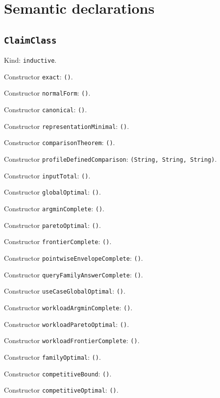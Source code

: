 \documentclass[11pt]{article}
\begin{document}
\section*{Semantic declarations}
\subsection*{\texttt{ClaimClass}}
\noindent Kind: \texttt{inductive}.\par
\noindent Constructor \texttt{exact}: \texttt{()}.\par
\noindent Constructor \texttt{normalForm}: \texttt{()}.\par
\noindent Constructor \texttt{canonical}: \texttt{()}.\par
\noindent Constructor \texttt{representationMinimal}: \texttt{()}.\par
\noindent Constructor \texttt{comparisonTheorem}: \texttt{()}.\par
\noindent Constructor \texttt{profileDefinedComparison}: \texttt{(String, String, String)}.\par
\noindent Constructor \texttt{inputTotal}: \texttt{()}.\par
\noindent Constructor \texttt{globalOptimal}: \texttt{()}.\par
\noindent Constructor \texttt{argminComplete}: \texttt{()}.\par
\noindent Constructor \texttt{paretoOptimal}: \texttt{()}.\par
\noindent Constructor \texttt{frontierComplete}: \texttt{()}.\par
\noindent Constructor \texttt{pointwiseEnvelopeComplete}: \texttt{()}.\par
\noindent Constructor \texttt{queryFamilyAnswerComplete}: \texttt{()}.\par
\noindent Constructor \texttt{useCaseGlobalOptimal}: \texttt{()}.\par
\noindent Constructor \texttt{workloadArgminComplete}: \texttt{()}.\par
\noindent Constructor \texttt{workloadParetoOptimal}: \texttt{()}.\par
\noindent Constructor \texttt{workloadFrontierComplete}: \texttt{()}.\par
\noindent Constructor \texttt{familyOptimal}: \texttt{()}.\par
\noindent Constructor \texttt{competitiveBound}: \texttt{()}.\par
\noindent Constructor \texttt{competitiveOptimal}: \texttt{()}.\par
\end{document}

